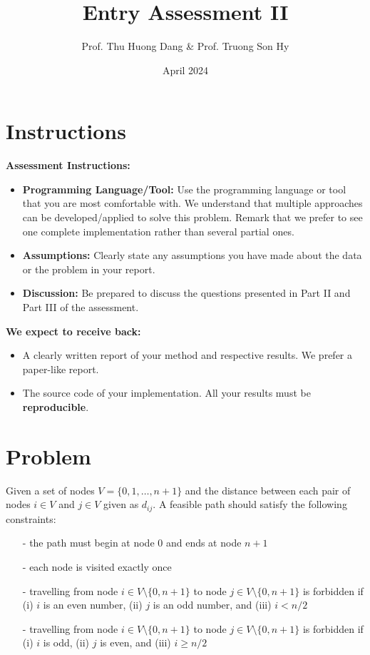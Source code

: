 \documentclass{article}
\title{Entry Assessment II}
\author{Prof. Thu Huong Dang \& Prof. Truong Son Hy}
\date{April 2024}
\begin{document}
\maketitle


\section*{Instructions}
\textbf{Assessment Instructions:}
\begin{itemize}
    \item \textbf{Programming Language/Tool:} Use the programming language or tool that you are most comfortable with. We understand that multiple approaches can be developed/applied to solve this problem. Remark that we prefer to see one complete implementation rather than several partial ones. %
    \item \textbf{Assumptions:} Clearly state any assumptions you have made about the data or the problem in your report.
    \item \textbf{Discussion:} Be prepared to discuss the questions presented in Part II and Part III of the assessment.
\end{itemize}
\vspace{3mm}

\textbf{We expect to receive back:}
\begin{itemize}
    \item A clearly written report of your method and respective results. We prefer a paper-like report.
    \item The source code of your implementation. All your results must be \textbf{reproducible}.
\end{itemize}

\section*{Problem}
Given a set of nodes $V = \{0, 1, \ldots, n+1\}$ and the distance between each pair of nodes $i\in V$ and $j \in V$ given as $d_{ij}$. A feasible path should satisfy the following constraints:
\begin{itemize}
    \item[-] the path must begin at node 0 and ends at node $n+1$
    \item[-] each node is visited exactly once
    \item[-] travelling from node $i \in V \setminus\{0, n+1\}$ to node $j \in V \setminus\{0, n+1\}$ is forbidden if (i) $i$ is an even number, (ii) $j$ is an odd number, and (iii) $i < n/2$
    \item[-] travelling from node $i \in V \setminus\{0, n+1\}$ to node $j \in V \setminus\{0, n+1\}$ is forbidden if (i) $i$ is odd, (ii) $j$ is even, and (iii) $i \ge n/2$
\end{itemize}
\end{document}
